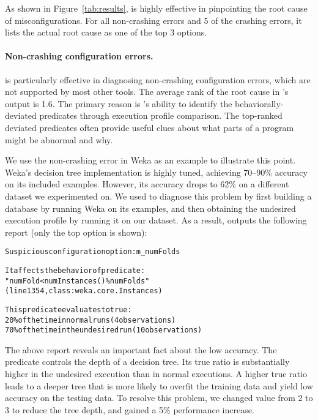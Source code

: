 

As shown in Figure~\ref{tab:results},
\ourtool is highly effective in pinpointing the root cause of
misconfigurations. For all \noncrash non-crashing errors
and 5 of the \crash crashing errors, it lists the actual root cause as one of the top 3 options. 


\paragraph{Non-crashing configuration errors.}

\ourtool is particularly effective in diagnosing non-crashing configuration
errors,
which are not supported by most other tools.
The average rank of the root cause
in \ourtool's output is 1.6.
The primary reason is
\ourtool's ability to identify the behaviorally-deviated predicates through
execution profile comparison. The top-ranked deviated predicates often provide
useful clues about what parts of a program might be abnormal and why.

We use the non-crashing error in Weka as an example to illustrate
this point. 
Weka's decision tree implementation is highly tuned, achieving 70--90\% accuracy on
its included examples. However, its accuracy drops to 62\%
on a different dataset we experimented on. We used \ourtool to diagnose this
problem by first building a database by running Weka on its examples, and
then
obtaining the undesired execution profile by running it on our dataset. As a result,
\ourtool outputs the following report (only the top option is shown):

\vspace{-1mm}

\begin{CodeOut}
\begin{alltt} 
  Suspicious configuration option: m\_numFolds

  It affects the behavior of predicate:
  "numFold < numInstances() \% numFolds"
  (line 1354, class: weka.core.Instances) 

  This predicate evaluates to true:
    20\% of the time in normal runs (4 observations)
    70\% of the time in the undesired run (10 observations)

\end{alltt}
\end{CodeOut}

\vspace{-4mm}

The above report reveals an important fact about the low accuracy.
The predicate  controls
the depth of a decision tree. Its
true ratio is substantially higher in the undesired execution
than in normal executions. A higher true ratio leads
to a deeper tree that is more likely to overfit the training
data and yield low accuracy on the testing data.
To resolve this problem, we changed 
value from 2 to 3 to reduce the tree depth, and
gained a 5\% performance increase.

